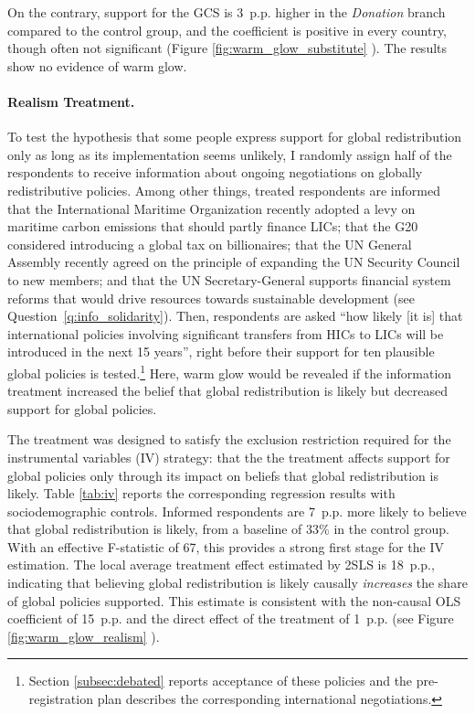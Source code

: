 \documentclass[12pt,english]{article}
\begin{document}
\begin{bibunit}
On the contrary, support for the GCS is 3~p.p. higher in the \textit{Donation} branch compared to the control group, and the coefficient is positive in every country, though often not significant (Figure \ref{fig:warm_glow_substitute}%
).
The results show no evidence of warm glow.

\paragraph{Realism Treatment.}

To test the hypothesis that some people express support for global redistribution only as long as its implementation seems unlikely, I randomly assign half of the respondents to receive information about ongoing negotiations on globally redistributive policies. Among other things, treated respondents are informed that the International Maritime Organization recently adopted a levy on maritime carbon emissions that should partly finance LICs; that the G20 considered introducing a global tax on billionaires; that the UN General Assembly recently agreed on the principle of expanding the UN Security Council to new members; and that the UN Secretary-General supports financial system reforms that would drive resources towards sustainable development (see Question~\ref{q:info_solidarity}).
Then, respondents are asked ``how likely [it is] that international policies involving significant transfers from HICs to LICs will be introduced in the next 15 years'', right before their support for ten plausible global policies is tested.\footnote{Section \ref{subsec:debated} reports acceptance of these policies and the pre-registration plan %
describes the corresponding international negotiations.}  Here, warm glow would be revealed if the information treatment increased the belief that global redistribution is likely but decreased support for global policies.

The treatment was designed to satisfy the exclusion restriction required for the instrumental variables (IV) strategy: that the the treatment affects support for global policies only through its impact on beliefs that global redistribution is likely. Table \ref{tab:iv} reports the corresponding regression results with sociodemographic controls. %
Informed respondents are 7~p.p. more likely to believe that global redistribution is likely, from a baseline of 33\% in the control group. With an effective F-statistic of 67, this provides a strong first stage for the IV estimation. %
The local average treatment effect estimated by 2SLS is 18~p.p., indicating that believing global redistribution is likely causally \textit{increases} the share of global policies supported. This estimate is consistent with the non-causal OLS coefficient of 15~p.p. and the direct effect of the treatment of 1~p.p. (see Figure \ref{fig:warm_glow_realism}%
).


\end{bibunit}
\end{document}
